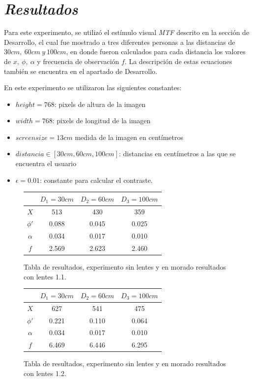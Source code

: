 \documentclass[conference]{IEEEtran}
\begin{document}
\section{\textit{Resultados}}

Para este experimento, se utilizó el estímulo visual \textit{MTF} descrito en la sección de Desarrollo, el cual fue mostrado a tres diferentes personas a las distancias de $30cm,\ 60cm\ y\ 100cm$, en donde fueron calculados para cada distancia los valores de $x,\ \phi,\ \alpha$ y frecuencia de observación $f$. La descripción de estas ecuaciones también se encuentra en el apartado de Desarrollo.

En este experimento se utilizaron las siguientes constantes:
\begin{itemize}
\item $height = 768$: pixels de altura de la imagen
\item $width = 768$: pixels de longitud de la imagen
\item $screensize=13cm$ medida de la imagen en centímetros
\item $distancia\in [30cm,60cm,100cm]$: distancias en centímetros a las que se encuentra el usuario
\item $\epsilon=0.01$: constante para calcular el contraste.
\end{itemize}

\begin{figure}[htbp]
\centering

\begin{tabular}{c|c|c|c|}
	 & $D_1=30cm$ & $D_2=60cm$ & $D_3=100 cm$\\
	\hline
	$X$ & 513 & 430 & 359\\
	\hline
	$\phi'$ & 0.088 & 0.045 & 0.025\\
	\hline
	$\alpha$ & 0.034 & 0.017 & 0.010\\
	\hline
	$f$ & 2.569 & 2.623 & 2.460\\
	\hline
\end{tabular}

\caption{Tabla de resultados, experimento sin lentes y en morado resultados con lentes 1.1.}
\label{res1.1}
\end{figure}


\begin{figure}[htbp]
\centering

\begin{tabular}{c|c|c|c|}
	 & $D_1=30cm$ & $D_2=60cm$ & $D_3=100 cm$\\
	\hline
	$X$ & 627 & 541 & 475\\
	\hline
	$\phi'$ & 0.221 & 0.110 & 0.064\\
	\hline
	$\alpha$ & 0.034 & 0.017 & 0.010\\
	\hline
	$f$ & 6.469 & 6.446 & 6.295\\
	\hline
\end{tabular}
\caption{Tabla de resultados, experimento sin lentes y en morado resultados con lentes 1.2.}
\label{res1.2}
\end{figure}
\end{document}
